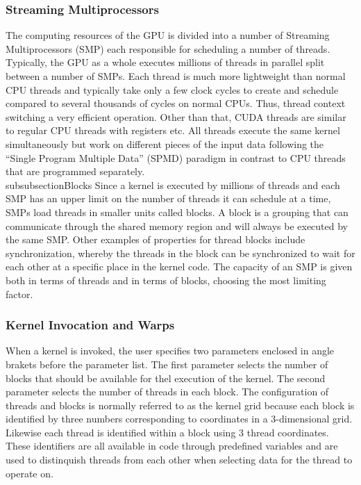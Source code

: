 \subsubsection{Streaming Multiprocessors}
The computing resources of the GPU is divided into a number of Streaming Multiprocessors (SMP) each responsible for scheduling a number of threads. Typically, the GPU as a whole executes millions of threads in parallel split between a number of SMPs. Each thread is much more lightweight than normal CPU threads and typically take only a few clock cycles to create and schedule compared to several thousands of cycles on normal CPUs. Thus, thread context switching a very efficient operation. Other than that, CUDA threads are similar to regular CPU threads with registers etc. All threads execute the same kernel simultaneously but work on different pieces of the input data following the ``Single Program Multiple Data'' (SPMD) paradigm in contrast to CPU threads that are programmed separately. \\

subsubsection{Blocks}
Since a kernel is executed by millions of threads and each SMP has an upper limit on the number of threads it can schedule at a time, SMPs load threads in smaller units called blocks. A block is a grouping that can communicate through the shared memory region and will always be executed by the same SMP. Other examples of properties for thread blocks include synchronization, whereby the threads in the block can be synchronized to wait for each other at a specific place in the kernel code. The capacity of an SMP is given both in terms of threads and in terms of blocks, choosing the most limiting factor.

\subsubsection{Kernel Invocation and Warps}
When a kernel is invoked, the user specifies two parameters enclosed in angle brakets before the parameter list. The first parameter selects the number of blocks that should be available for thel execution of the kernel. The second parameter selects the number of threads in each block. The configuration of threads and blocks is normally referred to as the kernel grid because each block is identified by three numbers corresponding to coordinates in a 3-dimensional grid. Likewise each thread is identified within a block using 3 thread coordinates. These identifiers are all available in code through predefined variables and are used to distinquish threads from each other when selecting data for the thread to operate on.

